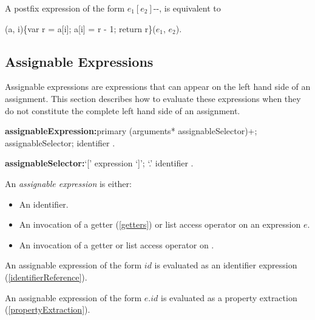 \documentclass{article}
\newcommand{\code}[1]{{\sf #1}}
\begin{document}
\LMHash{}
A postfix expression of the form \code{$e_1[e_2]$-{}-},  is equivalent to 

\code{(a, i)\{var r = a[i]; a[i] = r - 1; return r\}($e_1$, $e_2$)}.
 

\subsection{ Assignable Expressions}

\LMHash{}
Assignable expressions are expressions that can appear on the left hand side of an assignment.
This section describes how to evaluate these expressions when they do not constitute the complete left hand side of an assignment.




\begin{grammar}

{\bf assignableExpression:}primary (arguments* assignableSelector)+;
      \SUPER{} assignableSelector;
      identifier
    .
    
{\bf assignableSelector:}`[' expression `]'; %
      `{\escapegrammar .}' identifier
    .

\end{grammar}

\LMHash{}
An {\em assignable expression} is either:
\begin{itemize}
 \item An identifier. 
\item An invocation of a getter (\ref{getters}) or list access operator on an expression $e$.
\item An invocation of a getter or list access operator on  \SUPER{}.
\end{itemize}


\LMHash{}
An assignable expression of the form $id$ is evaluated as an identifier expression (\ref{identifierReference}).


\LMHash{}
An assignable expression of the form $e.id$ is evaluated as a property extraction  (\ref{propertyExtraction}).
\end{document}
